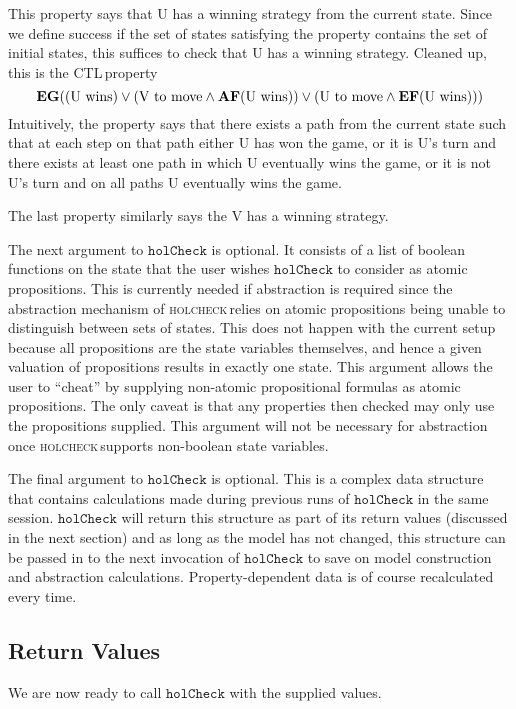 \documentclass{article}
\newcommand{\ctl}{\textsf{CTL}\,}
\newcommand{\hc}{\textsc{holcheck\,}}
\begin{document}
This property says that U has a winning strategy from the current state. Since we define success if the set of states satisfying the property contains the set of initial states, this suffices to check that U has a winning strategy. Cleaned up, this is the \ctl property \[ \mathbf{EG} (\textup{(U wins)} \lor (\textup{V to move} \land \mathbf{AF} (\textup{U wins})) \lor (\textup{U to move} \land \mathbf{EF} (\textup{U wins})))\] Intuitively, the property says that there exists a path from the current state such that at each step on that path either U has won the game, or it is U's turn and there exists at least one path in which U eventually wins the game, or it is not U's turn and on all paths U eventually wins the game. 

The last property similarly says the V has a winning strategy. 

The next argument to \(\mathtt{holCheck}\) is optional. It consists of a list of boolean functions on the state that the user wishes \(\mathtt{holCheck}\) to consider as atomic propositions. This is currently needed if abstraction is required since the abstraction mechanism of \hc relies on atomic propositions being unable to distinguish between sets of states. This does not happen with the current setup because all propositions are the state variables themselves, and hence a given valuation of propositions results in exactly one state. This argument allows the user to ``cheat'' by supplying non-atomic propositional formulas as atomic propositions. The only caveat is that any properties then checked may only use the propositions supplied. This argument will not be necessary for abstraction once \hc supports non-boolean state variables.

The final argument to  \(\mathtt{holCheck}\) is optional. This is a complex data structure that contains calculations made during previous runs of  \(\mathtt{holCheck}\) in the same session.  \(\mathtt{holCheck}\) will return this structure as part of its return values (discussed in the next section) and as long as the model has not changed, this structure can be passed in to the next invocation of  \(\mathtt{holCheck}\) to save on model construction and abstraction calculations. Property-dependent data is of course recalculated every time.    
\subsection{Return Values}

We are now ready to call \(\mathtt{holCheck}\) with the supplied values.
\end{document}
